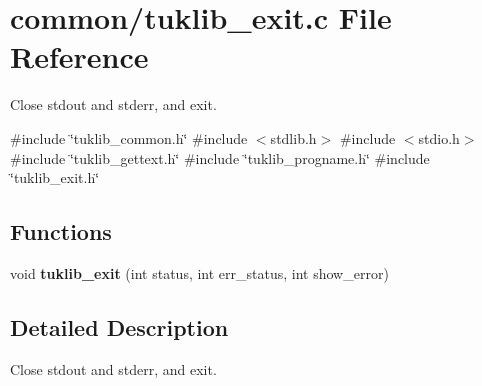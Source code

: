 \section{common/tuklib\+\_\+exit.c File Reference}
\label{tuklib__exit_8c}


Close stdout and stderr, and exit.  


{\ttfamily \#include \char`\"{}tuklib\+\_\+common.\+h\char`\"{}}\newline
{\ttfamily \#include $<$stdlib.\+h$>$}\newline
{\ttfamily \#include $<$stdio.\+h$>$}\newline
{\ttfamily \#include \char`\"{}tuklib\+\_\+gettext.\+h\char`\"{}}\newline
{\ttfamily \#include \char`\"{}tuklib\+\_\+progname.\+h\char`\"{}}\newline
{\ttfamily \#include \char`\"{}tuklib\+\_\+exit.\+h\char`\"{}}\newline
\subsection*{Functions}
\begin{DoxyCompactItemize}
\item 
\mbox{\label{tuklib__exit_8c_acd91d79afa1202dbaa59ede3d0892031}} 
void {\bfseries tuklib\+\_\+exit} (int status, int err\+\_\+status, int show\+\_\+error)
\end{DoxyCompactItemize}


\subsection{Detailed Description}
Close stdout and stderr, and exit. 


